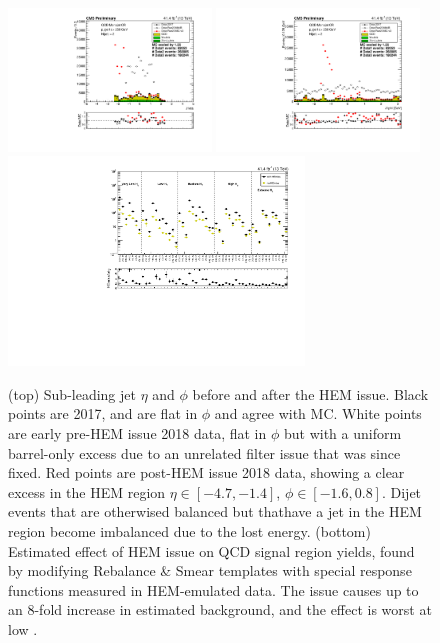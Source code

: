 \begin{figure}[t]
  \begin{center}
    \includegraphics[width=0.48\textwidth]{figs/event_selection/hem_subleadjeteta.pdf}
    \includegraphics[width=0.48\textwidth]{figs/event_selection/hem_subleadjetphi.pdf} \\
    \includegraphics[width=0.70\textwidth]{figs/event_selection/mc_closure_sr.pdf}
    \caption{(top) Sub-leading jet $\eta$ and $\phi$ before and after the HEM issue.
      Black points are 2017, and are flat in $\phi$ and agree with MC. White
      points are early pre-HEM issue 2018 data, flat in $\phi$ but with 
      a uniform barrel-only excess due to an unrelated filter issue that was since fixed.
      Red points are post-HEM issue 2018 data, showing a clear excess in the HEM region
      $\eta\in[-4.7,-1.4]$, $\phi\in[-1.6,0.8]$. Dijet events that are otherwised 
      balanced but thathave a jet in
      the HEM region become imbalanced due to the lost energy.
      (bottom) Estimated effect of HEM issue on QCD signal region yields, found by 
      modifying Rebalance \& Smear templates with special response functions measured
      in HEM-emulated data. The issue causes up to an 8-fold increase in estimated
      background, and the effect is worst at low \Ht.
            }
    \label{fig:hem}
  \end{center}
\end{figure}
